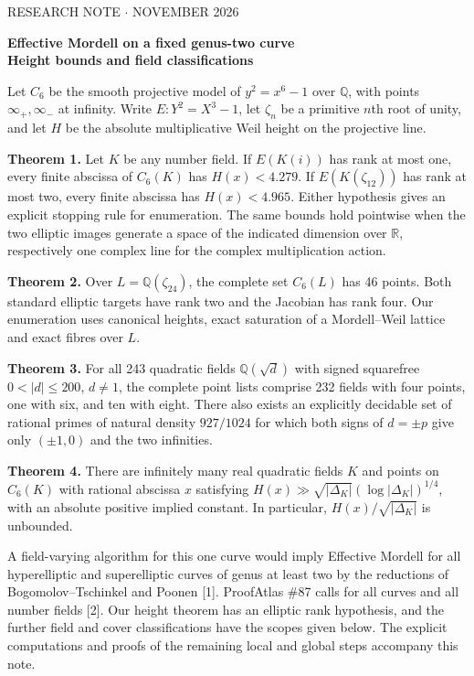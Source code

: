 \documentclass[12pt]{article}
\newcommand{\Q}{\mathbb Q}\newcommand{\Z}{\mathbb Z}\newcommand{\C}{C_6}
\begin{document}
{\small\sffamily\color{teal}RESEARCH NOTE \quad $\cdot$  NOVEMBER 2026}\par
{\LARGE\bfseries\color{ink}Effective Mordell on a fixed genus-two curve\\Height bounds and field classifications}\par
Let $\C$ be the smooth projective model of $y^2=x^6-1$ over $\Q$, with points $\infty_+,\infty_-$ at infinity. Write $E:Y^2=X^3-1$, let $\zeta_n$ be a primitive $n$th root of unity, and let $H$ be the absolute multiplicative Weil height on the projective line.

\textbf{Theorem 1.} Let $K$ be any number field. If $E(K(i))$ has rank at most one, every finite abscissa of $\C(K)$ has $H(x)<4.279$. If $E(K(\zeta_{12}))$ has rank at most two, every finite abscissa has $H(x)<4.965$. Either hypothesis gives an explicit stopping rule for enumeration. The same bounds hold pointwise when the two elliptic images generate a space of the indicated dimension over $\mathbb R$, respectively one complex line for the complex multiplication action.

\textbf{Theorem 2.} Over $L=\Q(\zeta_{24})$, the complete set $\C(L)$ has 46 points. Both standard elliptic targets have rank two and the Jacobian has rank four. Our enumeration uses canonical heights, exact saturation of a Mordell--Weil lattice and exact fibres over $L$.

\textbf{Theorem 3.} For all 243 quadratic fields $\Q(\sqrt d)$ with signed squarefree $0<|d|\le 200$, $d\ne1$, the complete point lists comprise 232 fields with four points, one with six, and ten with eight. There also exists an explicitly decidable set of rational primes of natural density $927/1024$ for which both signs of $d=\pm p$ give only $(\pm1,0)$ and the two infinities.

\textbf{Theorem 4.} There are infinitely many real quadratic fields $K$ and points on $\C(K)$ with rational abscissa $x$ satisfying $H(x)\gg\sqrt{|\Delta_K|}(\log|\Delta_K|)^{1/4}$, with an absolute positive implied constant. In particular, $H(x)/\sqrt{|\Delta_K|}$ is unbounded.

A field-varying algorithm for this one curve would imply Effective Mordell for all hyperelliptic and superelliptic curves of genus at least two by the reductions of Bogomolov--Tschinkel and Poonen [1]. ProofAtlas \#87 calls for all curves and all number fields [2]. Our height theorem has an elliptic rank hypothesis, and the further field and cover classifications have the scopes given below. The explicit computations and proofs of the remaining local and global steps accompany this note.
\end{document}
